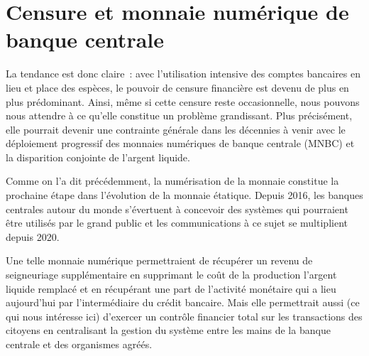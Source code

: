 
\section*{Censure et monnaie numérique de banque centrale}


La tendance est donc claire~: avec l'utilisation intensive des comptes bancaires en lieu et place des espèces, le pouvoir de censure financière est devenu de plus en plus prédominant. Ainsi, même si cette censure reste occasionnelle, nous pouvons nous attendre à ce qu'elle constitue un problème grandissant. Plus précisément, elle pourrait devenir une contrainte générale dans les décennies à venir avec le déploiement progressif des monnaies numériques de banque centrale (MNBC) et la disparition conjointe de l'argent liquide.

Comme on l'a dit précédemment, la numérisation de la monnaie constitue la prochaine étape dans l'évolution de la monnaie étatique. Depuis 2016, les banques centrales autour du monde s'évertuent à concevoir des systèmes qui pourraient être utilisés par le grand public et les communications à ce sujet se multiplient depuis 2020.

Une telle monnaie numérique permettraient de récupérer un revenu de seigneuriage supplémentaire en supprimant le coût de la production l'argent liquide remplacé et en récupérant une part de l'activité monétaire qui a lieu aujourd'hui par l'intermédiaire du crédit bancaire. Mais elle permettrait aussi (ce qui nous intéresse ici) d'exercer un contrôle financier total sur les transactions des citoyens en centralisant la gestion du système entre les mains de la banque centrale et des organismes agréés.

